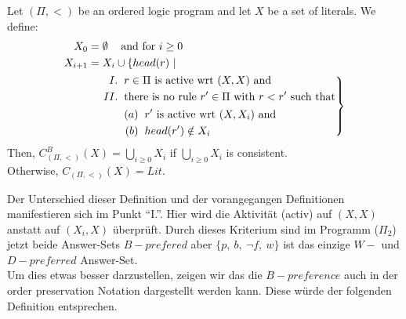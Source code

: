 \begin{definition}
  Let $(\Pi, <)$ be an ordered logic program and let $X$ be a set of literals.
  We define:
  \begin{equation*}
    \begin{split}
      X_0 & = \emptyset\hspace*{0.3cm} \text{~and for~} i \geq 0 \\
      X_{i+1} & = X_i \cup \{ head(r)~| \\
        & \hspace*{0.4cm}\left. \begin{aligned}
          I. &\hspace*{0.2cm} r \in \Pi \text{~is active wrt~} (X, X) \text{~and} \\
          II. &\hspace*{0.2cm} \text{there is no rule~} r' \in \Pi \text{~with~} r < r'
          \text{~such that} \\
          & \hspace*{0.2cm} \begin{aligned}
            (a) &\hspace*{0.2cm} r' \text{~is active wrt~} (X, X_i) \text{~and} \\
            (b) &\hspace*{0.2cm} head(r') \notin X_i
          \end{aligned}
        \end{aligned}
      \right \}
    \end{split}
  \end{equation*}
  Then, $C^{B}_{(\Pi, <)}(X) = \bigcup_{i\geq 0} X_i$ if $\bigcup_{i\geq 0} X_i$ is
  consistent. \\Otherwise, $C_{(\Pi, <)}(X) = Lit$.
  \label{def:1}
\end{definition}

Der Unterschied dieser Definition und der vorangegangen Definitionen manifestieren sich im Punkt ``I.''. Hier wird die Aktivität (activ) auf $(X,X)$ anstatt auf $(X_i,X)$ überprüft. Durch dieses Kriterium sind im Programm ($\Pi_2$) jetzt beide Answer-Sets $B-prefered$ aber $\{p,~b,~\neg f,~w\}$ ist das einzige $W-$ und $D-preferred$ Answer-Set.\\

Um dies etwas besser darzustellen, zeigen wir das die $B-preference$ auch in der order preservation Notation dargestellt werden kann. Diese würde der folgenden Definition entsprechen.\\

